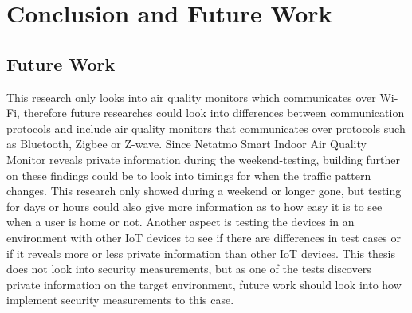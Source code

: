 \chapter{Conclusion and Future Work}



\section{Future Work}
This research only looks into air quality monitors which communicates over Wi-Fi, therefore future researches could look into differences between communication protocols and include air quality monitors that communicates over protocols such as Bluetooth, Zigbee or Z-wave. Since Netatmo Smart Indoor Air Quality Monitor reveals private information during the weekend-testing, building further on these findings could be to look into timings for when the traffic pattern changes. This research only showed during a weekend or longer gone, but testing for days or hours could also give more information as to how easy it is to see when a user is home or not. Another aspect is testing the devices in an environment with other IoT devices to see if there are differences in test cases or if it reveals more or less private information than other IoT devices. This thesis does not look into security measurements, but as one of the tests discovers private information on the target environment, future work should look into how implement security measurements to this case. 
